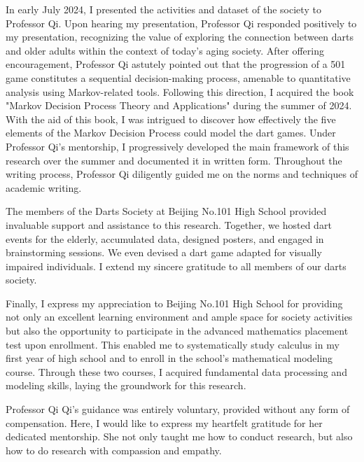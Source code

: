 \documentclass[cjjs]{ipart}
\theoremstyle{plain}
\begin{document}
In early July 2024, I presented the activities and dataset of the society to Professor Qi. Upon hearing my presentation, Professor Qi responded positively to my presentation, recognizing the value of exploring the connection between darts and older adults within the context of today's aging society. After offering encouragement, Professor Qi astutely pointed out that the progression of a 501 game constitutes a sequential decision-making process, amenable to quantitative analysis using Markov-related tools. Following this direction, I acquired the book "Markov Decision Process Theory and Applications" during the summer of 2024. With the aid of this book, I was intrigued to discover how effectively the five elements of the Markov Decision Process could model the dart games. Under Professor Qi’s mentorship, I progressively developed the main framework of this research over the summer and documented it in written form. Throughout the writing process, Professor Qi diligently guided me on the norms and techniques of academic writing.

The members of the Darts Society at Beijing No.101 High School provided invaluable support and assistance to this research. Together, we hosted dart events for the elderly, accumulated data, designed posters, and engaged in brainstorming sessions. We even devised a dart game adapted for visually impaired individuals. I extend my sincere gratitude to all members of our darts society.

Finally, I express my appreciation to Beijing No.101 High School for providing not only an excellent learning environment and ample space for society activities but also the opportunity to participate in the advanced mathematics placement test upon enrollment. This enabled me to systematically study calculus in my first year of high school and to enroll in the school's mathematical modeling course. Through these two courses, I acquired fundamental data processing and modeling skills, laying the groundwork for this research.

Professor Qi Qi's guidance was entirely voluntary, provided without any form of compensation. Here, I would like to express my heartfelt gratitude for her dedicated mentorship. She not only taught me how to conduct research, but also how to do research with compassion and empathy. 
\end{document}
